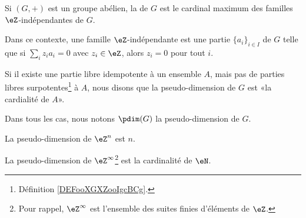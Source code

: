 \begin{definition}
	Si \( (G,+)\) est un groupe abélien, la	 de \( G\) est le cardinal maximum des familles \( \eZ\)-indépendantes de \( G\).

	Dans ce contexte, une famille \( \eZ\)-indépendante est une partie \( \{ a_i \}_{i\in I}\) de \( G\) telle que si \( \sum_iz_ia_i=0\) avec \( z_i\in \eZ\),  alors \( z_i=0\) pour tout \( i\).

	Si il existe une partie libre idempotente à un ensemble \( A\), mais pas de parties libres surpotentes\footnote{Définition \ref{DEFooXGXZooIgcBCg}.} à \( A\), nous disons que la pseudo-dimension de \( G\) est «la cardialité de \( A\)».

	Dans tous les cas, nous notons \( \pdim(G)\) la pseudo-dimension de \( G\).
\end{definition}

\begin{lemma}		\label{LEMooPASKooFGJgBz}
	La pseudo-dimension de \( \eZ^n\) est \( n\).

	La pseudo-dimension de \( \eZ^{\infty}\)\footnote{Pour rappel, \( \eZ^{\infty}\) est l'ensemble des suites finies d'éléments de \( \eZ\).} est la cardinalité de \( \eN\).
\end{lemma}


